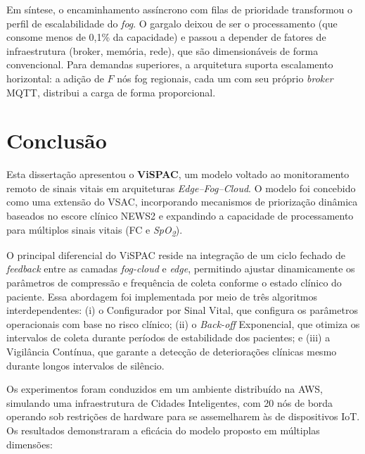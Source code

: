 \documentclass[twoside,english,brazilian]{UNISINOSmonografia}
\begin{document}
Em síntese, o encaminhamento assíncrono com filas de prioridade transformou o perfil de escalabilidade do \textit{fog}. O gargalo deixou de ser o processamento (que consome menos de 0,1\% da capacidade) e passou a depender de fatores de infraestrutura (broker, memória, rede), que são dimensionáveis de forma convencional. Para demandas superiores, a arquitetura suporta escalamento horizontal: a adição de $F$ nós fog regionais, cada um com seu próprio \textit{broker} MQTT, distribui a carga de forma proporcional.


\chapter{Conclusão}
Esta dissertação apresentou o \textbf{ViSPAC}, um modelo voltado ao monitoramento remoto de sinais vitais em arquiteturas \textit{Edge--Fog--Cloud}. O modelo foi concebido como uma extensão do VSAC, incorporando mecanismos de priorização dinâmica baseados no escore clínico NEWS2 e expandindo a capacidade de processamento para múltiplos sinais vitais (FC e \textit{SpO\textsubscript{2}}).

O principal diferencial do ViSPAC reside na integração de um ciclo fechado de \textit{feedback} entre as camadas \textit{fog-cloud} e \textit{edge}, permitindo ajustar dinamicamente os parâmetros de compressão e frequência de coleta conforme o estado clínico do paciente. Essa abordagem foi implementada por meio de três algoritmos interdependentes: (i) o Configurador por Sinal Vital, que configura os parâmetros operacionais com base no risco clínico; (ii) o \textit{Back-off} Exponencial, que otimiza os intervalos de coleta durante períodos de estabilidade dos pacientes; e (iii) a Vigilância Contínua, que garante a detecção de deteriorações clínicas mesmo durante longos intervalos de silêncio.

Os experimentos foram conduzidos em um ambiente distribuído na AWS, simulando uma infraestrutura de Cidades Inteligentes, com 20 nós de borda operando sob restrições de hardware para se assemelharem às de dispositivos IoT. Os resultados demonstraram a eficácia do modelo proposto em múltiplas dimensões:
\end{document}
